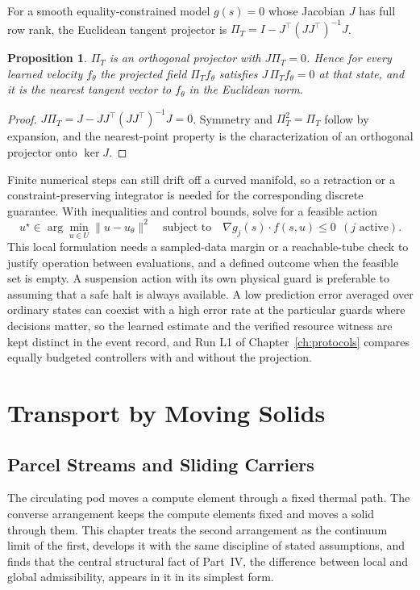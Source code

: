 \documentclass[11pt,openany]{book}
\theoremstyle{plain}
\newtheorem{proposition}[theorem]{Proposition}
\theoremstyle{definition}
\theoremstyle{remark}
\begin{document}
For a smooth equality-constrained model $g(s)=0$ whose Jacobian $J$ has full row rank, the Euclidean tangent projector is $\Pi_T=I-J^\top(JJ^\top)^{-1}J$.

\begin{proposition}
\label{prop:projector}
$\Pi_T$ is an orthogonal projector with $J\Pi_T=0$. Hence for every learned velocity $f_\theta$ the projected field $\Pi_Tf_\theta$ satisfies $J\,\Pi_Tf_\theta=0$ at that state, and it is the nearest tangent vector to $f_\theta$ in the Euclidean norm.
\end{proposition}
\begin{proof}
$J\Pi_T=J-JJ^\top(JJ^\top)^{-1}J=0$. Symmetry and $\Pi_T^2=\Pi_T$ follow by expansion, and the nearest-point property is the characterization of an orthogonal projector onto $\ker J$.
\end{proof}

Finite numerical steps can still drift off a curved manifold, so a retraction or a constraint-preserving integrator is needed for the corresponding discrete guarantee. With inequalities and control bounds, solve for a feasible action
\[
u^\star\in\arg\min_{u\in U}\|u-u_\theta\|^2\quad\text{subject to}\quad\nabla g_j(s)\cdot f(s,u)\le0\ \ (j\text{ active}).
\]
This local formulation needs a sampled-data margin or a reachable-tube check to justify operation between evaluations, and a defined outcome when the feasible set is empty. A suspension action with its own physical guard is preferable to assuming that a safe halt is always available. A low prediction error averaged over ordinary states can coexist with a high error rate at the particular guards where decisions matter, so the learned estimate and the verified resource witness are kept distinct in the event record, and Run L1 of Chapter~\ref{ch:protocols} compares equally budgeted controllers with and without the projection.
\part{Transport by Moving Solids}

\chapter{Parcel Streams and Sliding Carriers}
\label{ch:carrier}

The circulating pod moves a compute element through a fixed thermal path. The converse arrangement keeps the compute elements fixed and moves a solid through them. This chapter treats the second arrangement as the continuum limit of the first, develops it with the same discipline of stated assumptions, and finds that the central structural fact of Part~IV, the difference between local and global admissibility, appears in it in its simplest form.
\end{document}
